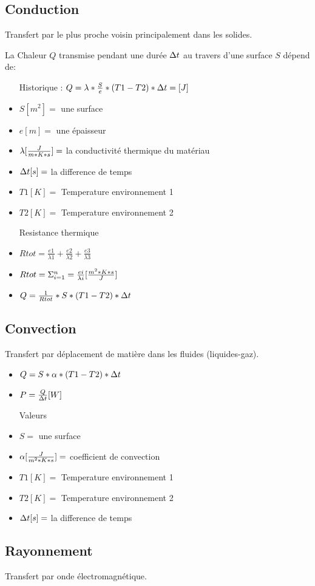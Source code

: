 \subsection{Conduction}
Transfert par le plus proche voisin principalement dans les solides.

La Chaleur $Q$ transmise pendant une durée ${\Delta}t$ au travers d'une surface $S$ dépend de:
\begin{itemize}
    \item[Historique :] $Q = \lambda * \frac{S}{e} *(T1-T2)* {\Delta}t = [J]$
    \item $S [m^2] =$ une surface
    \item $e [m] =$ une épaisseur
    \item $\lambda [\frac{J}{m*K*s}] =$ la conductivité thermique du matériau
    \item ${\Delta}t [s] =$ la difference de temps
    \item $T1 [K]=$ Temperature environnement 1
    \item $T2 [K]=$ Temperature environnement 2
    \item[Resistance thermique]
    \item$Rtot = \frac{e1}{{\lambda}1}+\frac{e2}{{\lambda}2}+\frac{e3}{{\lambda}3}$
    \item$Rtot = \Sigma^{n}_{i=1} = \frac{ei}{{\lambda}i} [\frac{m^2*K*s}{J}]$
    \item$Q = \frac{1}{Rtot} * S *(T1-T2) * {\Delta}t$ 
\end{itemize}



\subsection{Convection}
Transfert par déplacement de matière dans les fluides (liquides-gaz).

\begin{itemize}
    \item $Q = S * \alpha * (T1-T2) * {\Delta}t$
    \item $P = \frac{Q}{{\Delta}t} [W]$
    \item[Valeurs]
    \item $S =$ une surface
    \item $\alpha [\frac{J}{m^2*K*s}]=$ coefficient de convection
    \item $T1 [K]=$ Temperature environnement 1
    \item $T2 [K]=$ Temperature environnement 2
    \item ${\Delta}t [s] =$ la difference de temps
\end{itemize}

\subsection{Rayonnement}
Transfert par onde électromagnétique. 